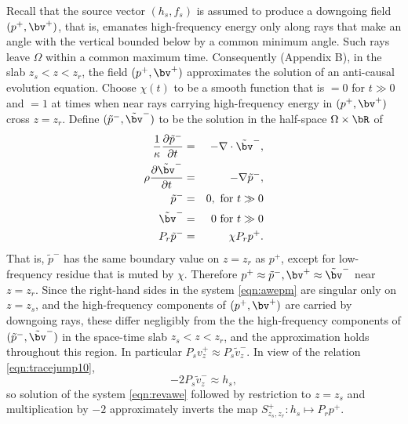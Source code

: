Recall that the source vector $(h_s,f_s)$ is assumed to produce a
downgoing field $(p^+,\bv^+)$, that is, emanates high-frequency energy only along
rays that make an angle with the vertical bounded below by a common
minimum angle. Such rays leave $\Omega$ within a common maximum
time. Consequently (Appendix B), in the
slab $z_s<z<z_r$, the field $(p^+,\bv^+)$ approximates the solution of an
anti-causal evolution equation. Choose $\chi(t)$ to be a smooth function
that is $= 0$ for $t \gg 0$ and $=1$ at times when near rays carrying
high-frequency energy in $(p^+,\bv^+)$ cross $z=z_r$. Define 
$(\tilde{p}^-,\tilde{\bv}^-)$ to be the solution in the half-space
$\Omega \times \bR$ of
\begin{eqnarray}
\label{eqn:revawe}
  \frac{1}{\kappa}\frac{\partial \tilde{p}^-}{\partial t} & = & - \nabla \cdot \tilde{\bv}^-, \nonumber \\
  \rho\frac{\partial \tilde{\bv}^-}{\partial t} & = & - \nabla \tilde{p}^-,\nonumber \\
  \tilde{p}^- & =& 0,  \mbox{ for } t \gg 0\\ 
  \tilde{\bv}^- & = & 0 \mbox{ for } t \gg 0\\
  P_r\tilde{p}^- &=& \chi P_rp^+ . 
\end{eqnarray}
That is, $\tilde{p}^-$ has the same boundary value on $z=z_r$ as
$p^+$, except for low-frequency residue that is muted by
$\chi$. Therefore
$p^+ \approx \tilde{p}^-, \bv^+ \approx \tilde{\bv}^-$ near
$z=z_r$. Since the right-hand sides in the system \ref{eqn:awepm} are
singular only on $z=z_s$, and the high-frequency components of
$(p^+,\bv^+)$ are carried by downgoing rays, these differ negligibly
from the the high-frequency components of
$(\tilde{p}^-,\tilde{\bv}^-)$ in the space-time slab $z_s<z<z_r$, and
the approximation holds throughout this region. In particular
$P_sv^+_z \approx P_s \tilde{v}^-_z$. In view of the relation
\ref{eqn:tracejump10},
\begin{equation}
  \label{eqn:tildevtohsubs}
  -2P_s\tilde{v}^-_z \approx h_s,
\end{equation}
so solution
of the system \ref{eqn:revawe} followed by restriction to $z=z_s$ and
multiplication by $-2$ 
approximately inverts the map $S^+_{z_s,z_r}: h_s \mapsto P_rp^+$.

